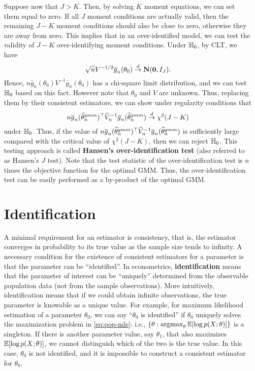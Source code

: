 \documentclass[11pt, A4paper, openany, uplatex]{book}
\begin{document}
Suppose now that $J > K$.
Then, by solving $K$ moment equations, we can set them equal to zero.
If all $J$ moment conditions are actually valid, then the remaining $J-K$ moment conditions should also be close to zero, otherwise they are away from zero.
This implies that in an over-identified model, we can test the validity of $J - K$ over-identifying moment conditions.
Under $\mathbb{H}_0$, by CLT, we have
\[
	\sqrt{n} V^{-1/2} \overline g_n (\theta_0) \overset{d}{\to} \mathbf{N}(\mathbf{0}, I_J).
\]
Hence, $n \bar g_n (\theta_0) V^{-1} \bar g_n (\theta_0)$ has a chi-square limit distribution, and we can test $\mathbb{H}_0$ based on this fact.
However note that $\theta_0$ and $V$ are unknown.
Thus, replacing them by their consistent estimators, we can show under regularity conditions that
\begin{align*}
	n \overline{g}_n(\widehat \theta_n^{gmm})^\top \widehat V_n^{-1} \overline{g}_n(\widehat \theta_n^{gmm}) \overset{d}{\to} \chi^2(J - K)
\end{align*}
under $\mathbb{H}_0$.
Thus, if the value of $n \overline{g}_n(\widehat \theta_n^{gmm})^\top \widehat V_n^{-1} \overline{g}_n(\widehat \theta_n^{gmm})$ is sufficiently large compared with the critical value of $\chi^2(J - K)$, then we can reject $\mathbb{H}_0$.
This testing approach is called \textbf{Hansen's over-identification test} (also referred to as Hansen's $J$ test).
Note that the test statistic of the over-identification test is $n$ times the objective function for the optimal GMM.
Thus, the over-identification test can be easily performed as a by-product of the optimal GMM.


\chapter{Identification}\label{chap:identification}

A minimal requirement for an estimator is consistency, that is, the estimator converges in probability to its true value as the sample size tends to infinity. 
A necessary condition for the existence of consistent estimators for a parameter is that the parameter can be ``identified''.
In econometrics, \textbf{identification} means that the parameter of interest can be ``uniquely'' determined from the observable population data (not from the sample observations).
More intuitively, identification means that if we could obtain infinite observations, the true parameter is knowable as a unique value.
For example, for maximum likelihood estimation of a parameter $\theta_0$, we can say ``$\theta_0$ is identified'' if $\theta_0$ uniquely solves the maximization problem in \eqref{eq:pop-mle}: i.e., $\{\theta : \operatorname*{\arg\!\max}_\theta \mathbb{E}[\log p(X; \theta)]\}$ is a singleton.
If there is another parameter value, say $\theta_1$, that also maximizes $\mathbb{E} [\log p(X; \theta)]$, we cannot distinguish which of the two is the true value.
In this case, $\theta_0$ is not identified, and it is impossible to construct a consistent estimator for $\theta_0$.
\end{document}

